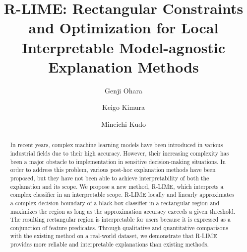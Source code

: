 \documentclass[runningheads]{llncs}
\begin{document}
\title{%
  R-LIME\@: Rectangular Constraints and Optimization for Local Interpretable
  Model-agnostic Explanation Methods
}


\author{Genji Ohara \and %
  Keigo Kimura \and      %
  Mineichi Kudo          %
}



\maketitle              %

\begin{abstract}
  In recent years,
  complex machine learning models have been introduced
  in various industrial fields due to their high accuracy.
  However,
  their increasing complexity has been a major obstacle to implementation
  in sensitive decision-making situations.
  In order to address this problem,
  various post-hoc explanation methods have been proposed,
  but they have not been able to achieve interpretability of
  both the explanation and its scope.
  We propose a new method, R-LIME,
  which interprets a complex classifier in an interpretable scope.
  R-LIME locally and linearly approximates a complex decision boundary
  of a black-box classifier in a rectangular region
  and maximizes the region as long as the approximation accuracy
  exceeds a given threshold.
  The resulting rectangular region is interpretable for users because it is
  expressed as a conjunction of feature predicates.
  Through qualitative and quantitative comparisons with the existing method
  on a real-world dataset,
  we demonstrate that R-LIME provides more reliable and interpretable
  explanations than existing methods.
\end{abstract}
\end{document}
